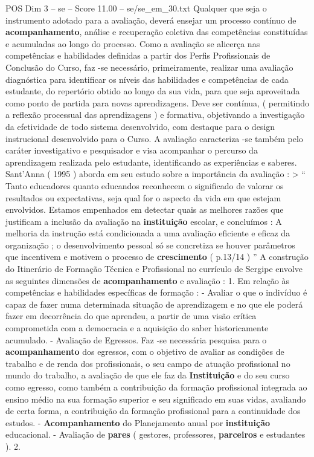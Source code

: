\begin{textsample}{POS Dim 3 – se – Score 11.00 – se/se\_em\_30.txt}
Qualquer que seja o instrumento adotado para a avaliação, deverá ensejar um processo contínuo de \textbf{acompanhamento}, análise e recuperação coletiva das competências constituídas e acumuladas ao longo do processo.
Como a avaliação se alicerça nas competências e habilidades definidas a partir dos Perfis Profissionais de Conclusão do Curso, faz -se necessário, primeiramente, realizar uma avaliação diagnóstica para identificar os níveis das habilidades e competências de cada estudante, do repertório obtido ao longo da sua vida, para que seja aproveitada como ponto de partida para novas aprendizagens.
Deve ser contínua, ( permitindo a reflexão processual das aprendizagens ) e formativa, objetivando a investigação da efetividade de todo sistema desenvolvido, com destaque para o design instrucional desenvolvido para o Curso.
A avaliação caracteriza -se também pelo caráter investigativo e pesquisador e visa acompanhar o percurso da aprendizagem realizada pelo estudante, identificando as experiências e saberes.
Sant’Anna ( 1995 ) aborda em seu estudo sobre a importância da avaliação : > “ Tanto educadores quanto educandos reconhecem o significado de valorar os resultados ou expectativas, seja qual for o aspecto da vida em que estejam envolvidos.
Estamos empenhados em detectar quais as melhores razões que justificam a inclusão da avaliação na \textbf{instituição} escolar, e concluímos : A melhoria da instrução está condicionada a uma avaliação eficiente e eficaz da organização ; o desenvolvimento pessoal só se concretiza se houver parâmetros que incentivem e motivem o processo de \textbf{crescimento} ( p.13/14 ) ” A construção do Itinerário de Formação Técnica e Profissional no currículo de Sergipe envolve as seguintes dimensões de \textbf{acompanhamento} e avaliação : 1.
Em relação às competências e habilidades específicas de formação : - Avaliar o que o indivíduo é capaz de fazer numa determinada situação de aprendizagem e no que ele poderá fazer em decorrência do que aprendeu, a partir de uma visão crítica comprometida com a democracia e a aquisição do saber historicamente acumulado. - Avaliação de Egressos.
Faz -se necessária pesquisa para o \textbf{acompanhamento} dos egressos, com o objetivo de avaliar as condições de trabalho e de renda dos profissionais, o seu campo de atuação profissional no mundo do trabalho, a avaliação de que ele faz da \textbf{Instituição} e do seu curso como egresso, como também a contribuição da formação profissional integrada ao ensino médio na sua formação superior e seu significado em suas vidas, avaliando de certa forma, a contribuição da formação profissional para a continuidade dos estudos. - \textbf{Acompanhamento} do Planejamento anual por \textbf{instituição} educacional. - Avaliação de \textbf{pares} ( gestores, professores, \textbf{parceiros} e estudantes ). 2.

\end{textsample}
